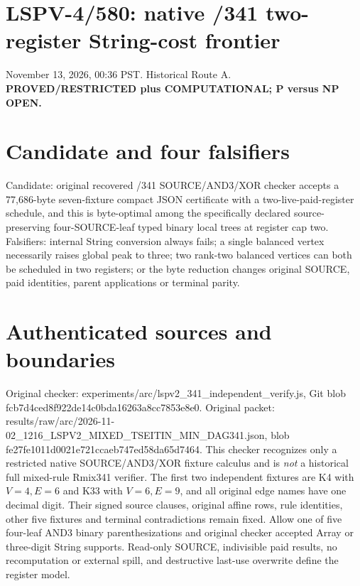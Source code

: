 \documentclass{article}
\begin{document}
\section*{LSPV-4/580: native /341 two-register String-cost frontier}
November 13, 2026, 00:36 PST. Historical Route A. \textbf{PROVED/RESTRICTED plus COMPUTATIONAL; P versus NP OPEN.}

\section*{Candidate and four falsifiers}
Candidate: original recovered /341 SOURCE/AND3/XOR checker accepts a 77,686-byte seven-fixture compact JSON certificate with a two-live-paid-register schedule, and this is byte-optimal among the specifically declared source-preserving four-SOURCE-leaf typed binary local trees at register cap two. Falsifiers: internal String conversion always fails; a single balanced vertex necessarily raises global peak to three; two rank-two balanced vertices can both be scheduled in two registers; or the byte reduction changes original SOURCE, paid identities, parent applications or terminal parity.

\section*{Authenticated sources and boundaries}
Original checker: experiments/arc/lspv2\_341\_independent\_verify.js, Git blob fcb7d4ced8f922de14c0bda16263a8cc7853e8e0. Original packet: results/raw/arc/2026-11-02\_1216\_LSPV2\_MIXED\_TSEITIN\_MIN\_DAG341.json, blob fe27fe1011d0021e721ccaeb747ed58da65d7464. This checker recognizes only a restricted native SOURCE/AND3/XOR fixture calculus and is \emph{not} a historical full mixed-rule Rmix341 verifier. The first two independent fixtures are K4 with \(V=4,E=6\) and K33 with \(V=6,E=9\), and all original edge names have one decimal digit. Their signed source clauses, original affine rows, rule identities, other five fixtures and terminal contradictions remain fixed. Allow one of five four-leaf AND3 binary parenthesizations and original checker accepted Array or three-digit String supports. Read-only SOURCE, indivisible paid results, no recomputation or external spill, and destructive last-use overwrite define the register model.
\end{document}
